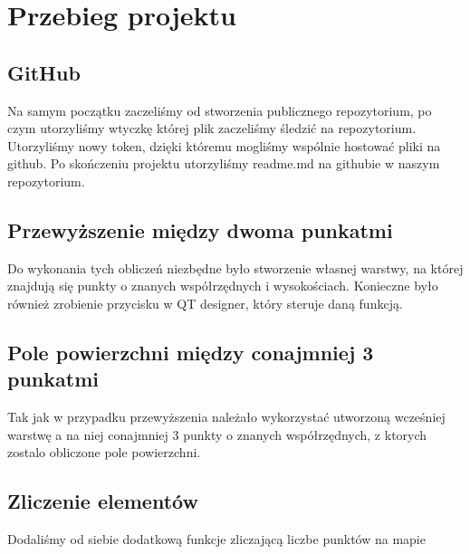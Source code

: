 \section{Przebieg projektu}
\subsection{GitHub} 
Na samym początku zaczeliśmy od stworzenia publicznego repozytorium, po czym utorzyliśmy wtyczkę której plik zaczeliśmy śledzić na repozytorium. Utorzyliśmy nowy token, dzięki któremu mogliśmy wspólnie hostować pliki na github. Po skończeniu projektu utorzyliśmy readme.md na githubie w naszym repozytorium.
\subsection{Przewyższenie między dwoma punkatmi} 
Do wykonania tych obliczeń niezbędne było stworzenie własnej warstwy, na której znajdują się punkty o znanych współrzędnych i wysokościach. Konieczne było również zrobienie przycisku w QT designer, który steruje daną funkcją.
\subsection{Pole powierzchni między conajmniej 3 punkatmi}   
Tak jak w przypadku przewyższenia należało wykorzystać utworzoną wcześniej warstwę a na niej conajmniej 3 punkty o znanych współrzędnych, z  ktorych zostalo obliczone pole powierzchni.
\subsection{Zliczenie elementów}
Dodaliśmy od siebie dodatkową funkcje zliczającą liczbe punktów na mapie 
